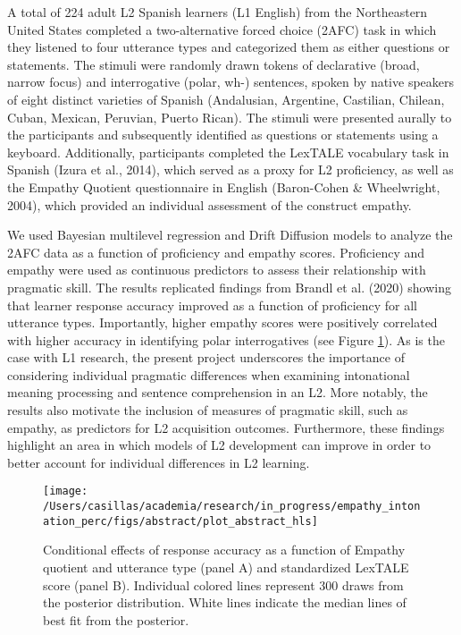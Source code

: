 \documentclass[
  12pt,
]{article}
\begin{document}
A total of 224 adult L2 Spanish learners (L1 English) from the
Northeastern United States completed a two-alternative forced choice
(2AFC) task in which they listened to four utterance types and
categorized them as either questions or statements. The stimuli were
randomly drawn tokens of declarative (broad, narrow focus) and
interrogative (polar, wh-) sentences, spoken by native speakers of eight
distinct varieties of Spanish (Andalusian, Argentine, Castilian,
Chilean, Cuban, Mexican, Peruvian, Puerto Rican). The stimuli were
presented aurally to the participants and subsequently identified as
questions or statements using a keyboard. Additionally, participants
completed the LexTALE vocabulary task in Spanish (Izura et al., 2014),
which served as a proxy for L2 proficiency, as well as the Empathy
Quotient questionnaire in English (Baron-Cohen \& Wheelwright, 2004),
which provided an individual assessment of the construct empathy.

We used Bayesian multilevel regression and Drift Diffusion models to
analyze the 2AFC data as a function of proficiency and empathy scores.
Proficiency and empathy were used as continuous predictors to assess
their relationship with pragmatic skill. The results replicated findings
from Brandl et al. (2020) showing that learner response accuracy
improved as a function of proficiency for all utterance types.
Importantly, higher empathy scores were positively correlated with
higher accuracy in identifying polar interrogatives (see Figure
\ref{fig:plot-2panel-emp-prof}). As is the case with L1 research, the
present project underscores the importance of considering individual
pragmatic differences when examining intonational meaning processing and
sentence comprehension in an L2. More notably, the results also motivate
the inclusion of measures of pragmatic skill, such as empathy, as
predictors for L2 acquisition outcomes. Furthermore, these findings
highlight an area in which models of L2 development can improve in order
to better account for individual differences in L2 learning.

\clearpage

\begin{figure}
\texttt{[image: /Users/casillas/academia/research/in\_progress/empathy\_intonation\_perc/figs/abstract/plot\_abstract\_hls]} \caption{Conditional effects of response accuracy as a function of Empathy 
quotient and utterance type (panel A) and standardized LexTALE score (panel B). 
Individual colored lines represent 300 draws from the posterior distribution. White lines indicate the median lines of best fit from the posterior.}\label{fig:plot-2panel-emp-prof}
\end{figure}
\end{document}
